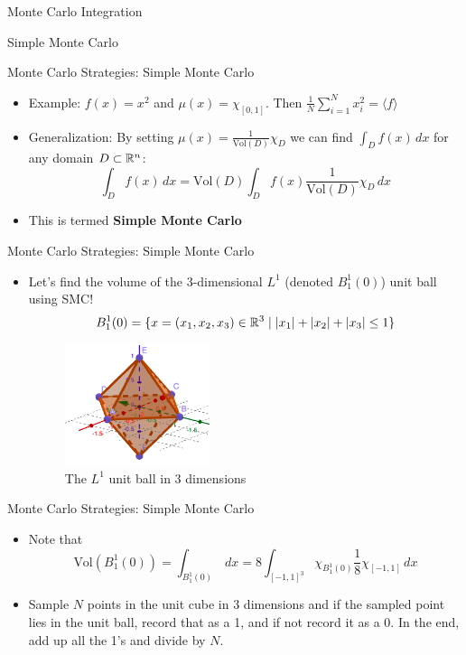 \documentclass{beamer}
\begin{document}
\begin{section}{Monte Carlo Integration}

\begin{subsection}{Simple Monte Carlo}

\begin{frame}{Monte Carlo Strategies: Simple Monte Carlo}
    \begin{itemize}
        \item Example: $f(x) = x^2$ and $\mu(x) = \chi_{[0,1]}$. \pause Then $\frac{1}{N}\sum_{i=1}^{N}x^{2}_{i} = \langle f \rangle$
        \pause
        \item Generalization: By setting $\mu(x) = \frac{1}{\text{Vol}(D)}\chi_{D}$ we can find $\int_{D}f(x)\,dx$ for any domain $D \subset \mathbb{R}^n$: \pause
        $$ \int_{D}f(x)\,dx = \text{Vol}(D)\int_{D}f(x)\frac{1}{\text{Vol}(D)}\chi_{D}\,dx$$ \pause
        \item This is termed \textbf{Simple Monte Carlo}
    \end{itemize}
\end{frame}

\begin{frame}{Monte Carlo Strategies: Simple Monte Carlo}
    \begin{itemize}
        \item Let's find the volume of the 3-dimensional $L^1$ (denoted $B^{1}_{1}(0)$) unit ball using SMC!
        \pause
        $$ B^{1}_{1}(0) = \{x = (x_1, x_2, x_3) \in \mathbb{R}^3 \mid |x_1| + |x_2| + |x_3| \leq 1\}$$
        \pause
        \begin{figure}
            \centering
            \includegraphics[width=0.4\textwidth]{L1.png}
            \caption{The $L^1$ unit ball in 3 dimensions}
            \label{fig:L1UB}
        \end{figure}
        \end{itemize}
        \end{frame}
        \begin{frame}{Monte Carlo Strategies: Simple Monte Carlo}
        \begin{itemize}
        \item Note that
        $$ \text{Vol}(B^{1}_{1}(0)) = \int_{B^{1}_{1}(0)}\,dx = 8\int_{[-1,1]^3}\chi_{B^{1}_{1}(0)}\frac{1}{8}\chi_{[-1,1]}\,dx$$
        \pause
        \item Sample $N$ points in the unit cube in 3 dimensions and if the sampled point lies in the unit ball, record that as a 1, and if not record it as a 0. In the end, add up all the 1's and divide by $N$. 
    \end{itemize}
\end{frame}


\end{subsection}
\end{section}
\end{document}
